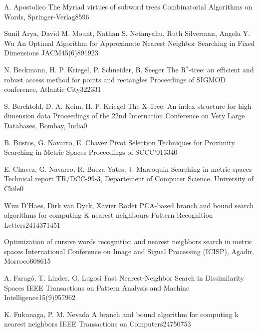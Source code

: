 
 {A.  Apostolico}
{The Myriad virtues of subword trees}
{Combinatorial Algorithms on Words, Springer-Verlag}{}{85}{96}

 {Sunil Arya, David M. Mount, Nathan S. Netanyahu, Ruth Silverman, Angela Y. Wu}
{An Optimal Algorithm for Approximate Nearest Neighbor Searching in Fixed Dimensions}
{JACM}{45(6)}{891}{923}

 {N. Beckmann, H. P. Kriegel, P. Schneider, B. Seeger}
{The R$^*$-tree: an efficient and robust access method for points and rectangles}
{Proceedings of SIGMOD conference, Atlantic City}{}{322}{331}

 {S. Berchtold, D. A. Keim, H. P. Kriegel}
{The X-Tree: An index structure for high dimension data}
{Proceedings of the 22nd Internation Conference on Very Large Databases, Bombay, India}{}{0}{}

 {B. Bustos, G. Navarro,  E. Chavez}
{Pivot Selection Techniques for Proximity Searching in Metric Spaces}
{Proceedings of SCCC'01}{}{33}{40}

 {E. Chavez, G. Navarro, R. Baeza-Yates, J. Marroquin}
{Searching in metric spaces}
{Technical report TR/DCC-99-3, Departement of Computer Science, University of Chile}{}{0}{}

 {Wim D'Haes, Dirk van Dyck, Xavier Rodet}
{PCA-based branch and bound search algorithms for computing K nearest neighbours}
{Pattern Recognition Letters}{24}{1437}{1451}

{Optimization of cursive words recognition and nearest neighbors search in metric spaces}
{International Conference on Image and Signal Processing (ICISP), Agadir, Morroco}{}{608}{615}

 {A. Farag\'o, T. Linder, G. Lugosi}
{Fast Nearest-Neighbor Search in Dissimilarity Spaces}
{IEEE Transactions on Pattern Analysis and Machine Intelligence}{15(9)}{957}{962}

 {K. Fukunaga, P. M. Nevada}
{A branch and bound algorithm for computing k nearest neighbors}
{IEEE Transactions on Computers}{24}{750}{753}

